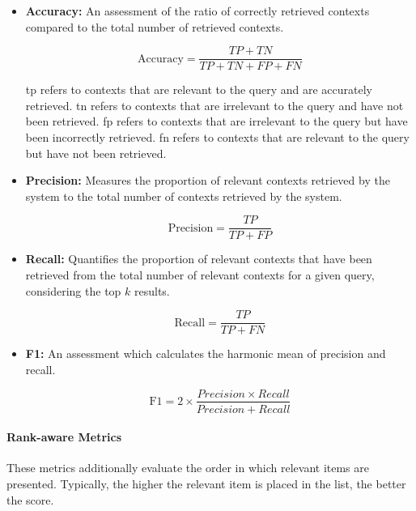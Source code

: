 \begin{itemize}
    \item \textbf{Accuracy:} An assessment of the ratio of correctly retrieved contexts compared to the total number of retrieved contexts.
    
    \[
    \text{Accuracy} = \frac{TP + TN}{TP + TN + FP + FN}
    \]

    \gls{tp} refers to contexts that are relevant to the query and are accurately retrieved. \gls{tn} refers to contexts that are irrelevant to the query and have not been retrieved. \gls{fp} refers to contexts that are irrelevant to the query but have been incorrectly retrieved. \gls{fn} refers to contexts that are relevant to the query but have not been retrieved.

    \item \textbf{Precision:} Measures the proportion of relevant contexts retrieved by the system to the total number of contexts retrieved by the system.
    
    \[
    \text{Precision} = \frac{TP}{TP + FP}
    \]

    \item \textbf{Recall:} Quantifies the proportion of relevant contexts that have been retrieved from the total number of relevant contexts for a given query, considering the top \(k\) results.
    
    \[
    \text{Recall} = \frac{TP}{TP + FN}
    \]

    \item \textbf{F1:} An assessment which calculates the harmonic mean of precision and recall.

    \[
    \text{F1} = 2 \times \frac{Precision \times Recall}{Precision + Recall}
    \]
\end{itemize}


\paragraph{Rank-aware Metrics} These metrics additionally evaluate the order in which relevant items are presented. Typically, the higher the relevant item is placed in the list, the better the score.

